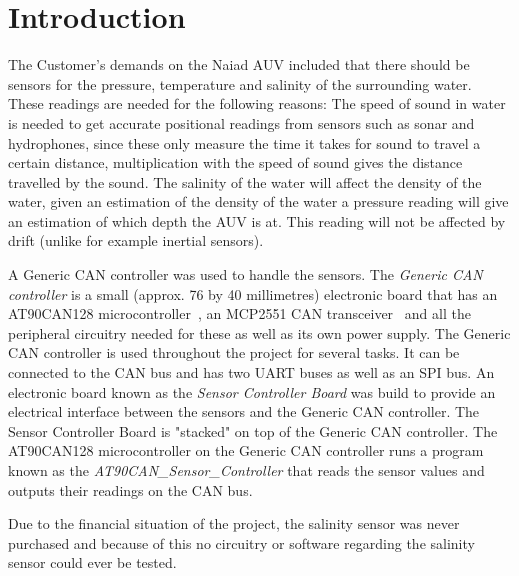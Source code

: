 
\section{Introduction}\label{sec:introduction}
The Customer's demands on the Naiad AUV included that there should be sensors for the pressure, temperature and salinity of the surrounding water. These readings are needed for the following reasons: \newline
The speed of sound in water is needed to get accurate positional readings from sensors such as sonar and hydrophones, since these only measure the time it takes for sound to travel a certain distance, multiplication with the speed of sound gives the distance travelled by the sound. \newline
The salinity of the water will affect the density of the water, given an estimation of the density of the water a pressure reading will give an estimation of which depth the AUV is at. This reading will not be affected by drift (unlike for example inertial sensors).

A Generic CAN controller was used to handle the sensors. The \emph{Generic CAN controller} is a small (approx. 76 by 40 millimetres) electronic board that has an AT90CAN128 microcontroller~\cite{web:at90can}, an MCP2551 CAN transceiver~\cite{web:mcp2551} and all the peripheral circuitry needed for these as well as its own power supply. The Generic CAN controller is used throughout the project for several tasks. It can be connected to the CAN bus and has two UART buses as well as an SPI bus. \newline
An electronic board known as the \emph{Sensor Controller Board} was build to provide an electrical interface between the sensors and the Generic CAN controller. The Sensor Controller Board is "stacked" on top of the Generic CAN controller. \newline
The AT90CAN128 microcontroller on the Generic CAN controller runs a program known as the \newline
\emph{AT90CAN\_Sensor\_Controller} that reads the sensor values and outputs their readings on the CAN bus.

Due to the financial situation of the project, the salinity sensor was never purchased and because of this no circuitry or software regarding  the salinity sensor could ever be tested. 

